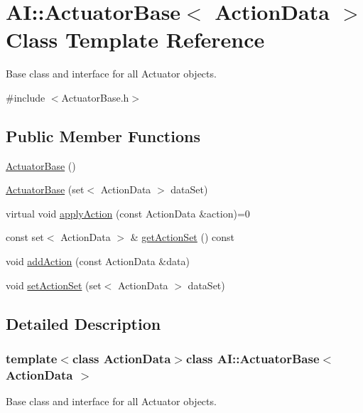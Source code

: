 \hypertarget{classAI_1_1ActuatorBase}{\section{A\+I\+:\+:Actuator\+Base$<$ Action\+Data $>$ Class Template Reference}
\label{classAI_1_1ActuatorBase}
}


Base class and interface for all Actuator objects.  




{\ttfamily \#include $<$Actuator\+Base.\+h$>$}

\subsection*{Public Member Functions}
\begin{DoxyCompactItemize}
\item 
\hyperlink{classAI_1_1ActuatorBase_aa58ed23d9f5821a20f7a0d3ce38a78fb}{Actuator\+Base} ()
\item 
\hyperlink{classAI_1_1ActuatorBase_a2f59e4f7afbaa20a5fcc9482661c7df2}{Actuator\+Base} (set$<$ Action\+Data $>$ data\+Set)
\item 
virtual void \hyperlink{classAI_1_1ActuatorBase_aecd4ee9cf0e33633c1c48028b4cb89a1}{apply\+Action} (const Action\+Data \&action)=0
\item 
const set$<$ Action\+Data $>$ \& \hyperlink{classAI_1_1ActuatorBase_a9cdda5a803a74a6f4c2c93b9dd3e62fc}{get\+Action\+Set} () const 
\item 
void \hyperlink{classAI_1_1ActuatorBase_acb2aab24c4489d4e084935eb6051ee50}{add\+Action} (const Action\+Data \&data)
\item 
void \hyperlink{classAI_1_1ActuatorBase_ac27dd4d19cc38145fbc9ab1e706264fc}{set\+Action\+Set} (set$<$ Action\+Data $>$ data\+Set)
\end{DoxyCompactItemize}


\subsection{Detailed Description}
\subsubsection*{template$<$class Action\+Data$>$class A\+I\+::\+Actuator\+Base$<$ Action\+Data $>$}

Base class and interface for all Actuator objects. 


